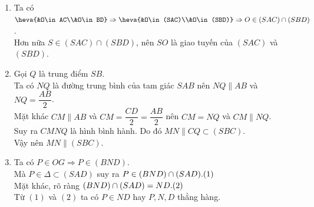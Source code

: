 \begin{bt}
{\begin{center}
\end{center}
\begin{enumerate}
\item Ta có $\heva{&O\in AC\\&O\in BD}\Rightarrow \heva{&O\in (SAC)\\&O\in (SBD)}\Rightarrow O \in (SAC)\cap (SBD)$.\\
Hơn nữa $S \in (SAC)\cap (SBD)$, nên $SO$ là giao tuyến của $(SAC)$ và $(SBD)$.
\item Gọi $Q$ là trung điểm $SB$.\\
Ta có $NQ$ là đường trung bình của tam giác $SAB$ nên $NQ \parallel AB$ và $NQ = \dfrac{AB}{2}$.\\
Mặt khác $CM \parallel AB$ và $CM = \dfrac{CD}{2}=\dfrac{AB}{2}$ nên $CM = NQ$ và $CM \parallel NQ$.\\
Suy ra $CMNQ$ là hình bình hành. Do đó $MN \parallel CQ \subset (SBC)$.\\
Vậy nên $MN \parallel (SBC)$.
\item Ta có $P \in OG \Rightarrow P \in (BND)$.\\
Mà $P \in \Delta \subset (SAD)$ suy ra $P\in (BND) \cap (SAD). \hfill (1)$\\
Mặt khác, rõ ràng $(BND) \cap (SAD) = ND. \hfill (2)$\\
Từ $(1)$ và $(2)$ ta có $P \in ND$ hay $P,N,D$ thẳng hàng.\vspace{-1cm}
\end{enumerate}
}
\end{bt}

